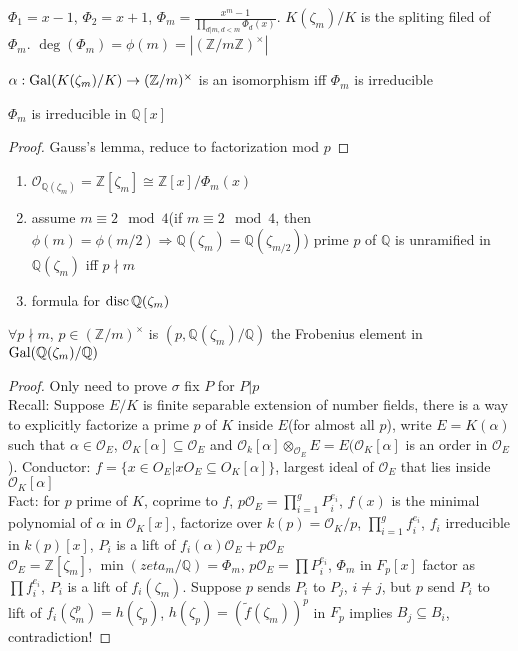 \documentclass[main]{subfiles}
\begin{document}
$\Phi_1=x-1$, $\Phi_2=x+1$, $\Phi_m=\frac{x^m-1}{\prod_{d|m,d<m}\Phi_d(x)}$. $K(\zeta_m)/K$ is the spliting filed of $\Phi_m$. $\deg(\Phi_m)=\phi(m)=|(\mathbb Z/m\mathbb Z)^\times|$

$\alpha:\operatorname{Gal}(K(\zeta_m)/K)\to (\mathbb Z/m)^\times$ is an isomorphism iff $\Phi_m$ is irreducible

\begin{theorem}[Gauss]
$\Phi_m$ is irreducible in $\mathbb Q[x]$
\end{theorem}

\begin{proof}
Gauss's lemma, reduce to factorization mod $p$
\end{proof}

\begin{fact}
\begin{enumerate}
\item $\mathcal O_{\mathbb Q(\zeta_m)}=\mathbb Z[\zeta_m]\cong \mathbb Z[x]/\Phi_m(x)$
\item assume $m\equiv2\mod 4$(if $m\equiv2\mod4$, then $\phi(m)=\phi(m/2)\Rightarrow\mathbb Q(\zeta_m)=\mathbb Q(\zeta_{m/2})$)
prime $p$ of $\mathbb Q$ is unramified in $\mathbb Q(\zeta_m)$ iff $p\nmid m$
\item formula for $\operatorname{disc} \mathbb Q(\zeta_m)$
\end{enumerate}
\end{fact}

\begin{lemma}
$\forall p\nmid m$, $p \in(\mathbb Z/m)^\times$ is $(p,\mathbb Q(\zeta_m)/\mathbb Q)$ the Frobenius element in $\operatorname{Gal}(\mathbb Q(\zeta_m)/\mathbb Q)$
\end{lemma}

\begin{proof}
Only need to prove $\sigma$ fix $P$ for $P|p$ \\
Recall: Suppose $E/K$ is finite separable extension of number fields, there is a way to explicitly factorize a prime $p$ of $K$ inside $E$(for almost all $p$), write $E=K(\alpha)$ such that $\alpha\in\mathcal O_E$, $\mathcal O_K[\alpha]\subseteq\mathcal O_E$ and $\mathcal O_k[\alpha]\otimes_{\mathcal O_E}E=E(\mathcal O_K[\alpha]$ is an order in $\mathcal O_E$). Conductor: $f=\{x\in O_E|xO_E\subseteq O_K[\alpha]\}$, largest ideal of $\mathcal O_E$ that lies inside $\mathcal O_K[\alpha]$ \\
Fact: for $p$ prime of $K$, coprime to $f$, $p\mathcal O_E=\prod_{i=1}^gP_i^{e_i}$, $f(x)$ is the minimal polynomial of $\alpha$ in $\mathcal O_K[x]$, factorize over $k(p)=\mathcal O_K/p$, $\prod_{i=1}^gf_i^{e_i}$, $f_i$ irreducible in $k(p)[x]$, $P_i$ is a lift of $f_i(\alpha)\mathcal O_E+p\mathcal O_E$ \\
$\mathcal O_E=\mathbb Z[\zeta_m]$, $\min(zeta_m/\mathbb Q)=\Phi_m$, $p\mathcal O_E=\prod P_i^{e_i}$, $\Phi_m$ in $F_p[x]$ factor as $\prod f_i^{e_i}$, $P_i$ is a lift of $f_i(\zeta_m)$. Suppose $p$ sends $P_i$ to $P_j$, $i\neq j$, but $p$ send $P_i$ to lift of $f_i(\zeta_m^p)=h(\zeta_p)$, $h(\zeta_p)=(\tilde f(\zeta_m))^p$ in $F_p$ implies $B_j\subseteq B_i$, contradiction!
\end{proof}
\end{document}
